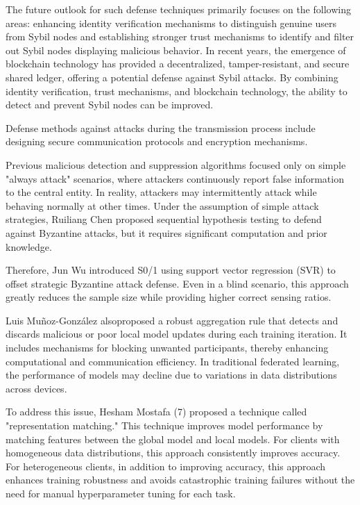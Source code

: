 \documentclass[conference]{IEEEtran}
\begin{document}
The future outlook for such defense techniques primarily focuses on the following areas:
enhancing identity verification mechanisms to distinguish genuine users from Sybil nodes 
and establishing stronger trust mechanisms to identify and filter out Sybil nodes displaying
malicious behavior. In recent years, the emergence of blockchain technology has provided a 
decentralized, tamper-resistant, and secure shared ledger, offering a potential defense against 
Sybil attacks. By combining identity verification, trust mechanisms, and blockchain technology, 
the ability to detect and prevent Sybil nodes can be improved.


Defense methods against attacks during the transmission process include designing secure communication protocols and encryption mechanisms.

Previous malicious detection and suppression algorithms focused only on simple "always attack" 
scenarios, where attackers continuously report false information to the central entity. 
In reality, attackers may intermittently attack while behaving normally at other times. 
Under the assumption of simple attack strategies, Ruiliang Chen \cite{b129} proposed sequential hypothesis
testing to defend against Byzantine attacks, but it requires significant computation and prior 
knowledge. 

Therefore, Jun Wu \cite{b119} introduced S0/1 using support vector regression (SVR) to offset 
strategic Byzantine attack defense. Even in a blind scenario, this approach greatly reduces the 
sample size while providing higher correct sensing ratios.


Luis Muñoz-González \cite{b127} alsoproposed a robust aggregation rule that detects and discards malicious or poor local model updates during each training iteration. It includes mechanisms for blocking unwanted participants, thereby enhancing computational and communication efficiency.
In traditional federated learning, the performance of models may decline due to variations in data distributions across devices. 

To address this issue, Hesham Mostafa (7) proposed a technique called "representation matching." 
This technique improves model performance by matching features between the global model and 
local models. For clients with homogeneous data distributions, this approach consistently 
improves accuracy. For heterogeneous clients, in addition to improving accuracy, this approach 
enhances training robustness and avoids catastrophic training failures without the need for manual 
hyperparameter tuning for each task.
\end{document}
